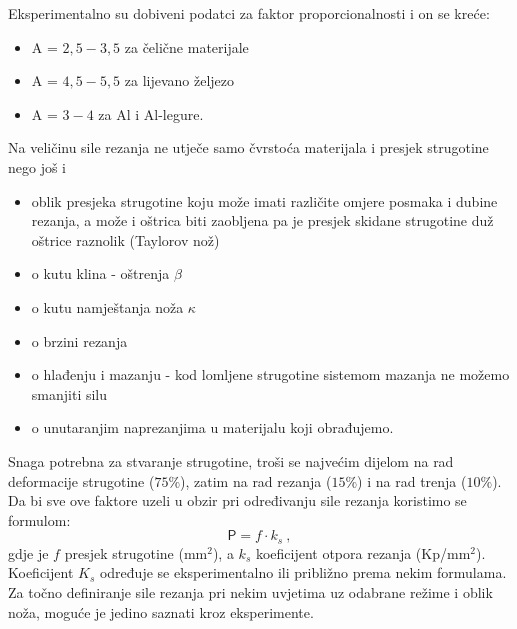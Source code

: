 \documentclass[a4paper,12pt]{article}
\numberwithin{figure}{section}
\begin{document}
Eksperimentalno su dobiveni podatci za faktor proporcionalnosti i on se kreće:
\begin{itemize}
\item A = $2,5 - 3,5$ za čelične materijale
\item A = $4,5 - 5,5$ za lijevano željezo
\item A = $3 - 4$ za Al i Al-legure.
\end{itemize} 
Na veličinu sile rezanja ne utječe samo čvrstoća materijala i presjek strugotine nego još i
\begin{itemize}
\item oblik presjeka strugotine koju može imati različite omjere posmaka i dubine rezanja, a može i oštrica biti zaobljena pa je presjek skidane strugotine duž oštrice raznolik (Taylorov nož)
\item o kutu klina - oštrenja $\beta$
\item o kutu namještanja noža $\kappa$
\item o brzini rezanja
\item o hlađenju i mazanju - kod lomljene strugotine sistemom mazanja ne možemo smanjiti silu
\item o unutaranjim naprezanjima u materijalu koji obrađujemo.
\end{itemize} 
Snaga potrebna za stvaranje strugotine, troši se najvećim dijelom na rad deformacije strugotine ($75\%$), zatim na rad rezanja ($15\%$) i na rad trenja ($10\%$).
Da bi sve ove faktore uzeli u obzir pri određivanju sile rezanja koristimo se formulom:
\begin{equation}
\mathsf{P} = f \cdot k_{s}\:,
\end{equation}
gdje je $f$ presjek strugotine (mm$^{2}$), a $k_{s}$ koeficijent otpora rezanja (Kp/mm$^{2}$). Koeficijent $K_{s}$ određuje se eksperimentalno ili približno prema nekim formulama.
Za točno definiranje sile rezanja pri nekim uvjetima uz odabrane režime i oblik noža, moguće je jedino saznati kroz eksperimente.
\end{document}
